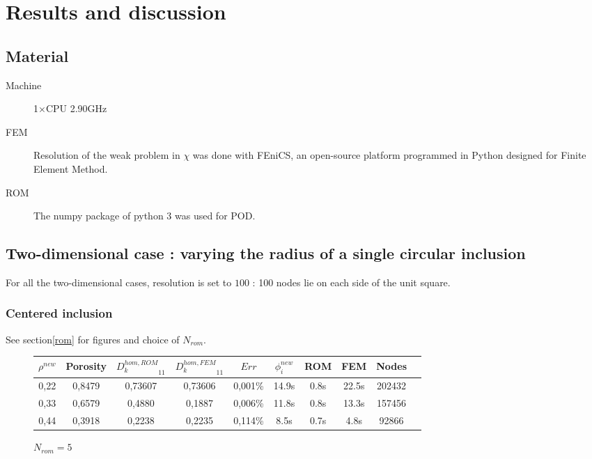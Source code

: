 \section{Results and discussion}\label{res}

\subsection{Material}

\begin{description}
\item [Machine] 1$\times$CPU 2.90GHz
\item [FEM] Resolution of the weak problem in $\chi$ was done with FEniCS, %
an open-source platform programmed in Python designed for Finite Element Method.
\item [ROM] The numpy package of python 3 was used for POD.
\end{description}

\subsection{Two-dimensional case : varying the radius of a single circular inclusion}

For all the two-dimensional cases, resolution is set to $100$ : %
100 nodes lie on each side of the unit square.

\subsubsection{Centered inclusion}

See section\ref{rom} for figures and choice of $N_{rom}$.

\begin{figure}[H]%
%
\begin{center}
\begin{tabular}{|c|c||c|c||c|c||c|c||c||c|}
\hline
$\rho^{new}$&Porosity&${D_k^{hom,ROM}}_{11}$&${D_k^{hom,FEM}}_{11}$&$Err$&$\phi_i^{new}$&ROM&FEM&Nodes\\
\hline
0,22&0,8479&0,73607&0,73606&0,001\%&14.9s&0.8s&22.5s&202432\\
\hline
0,33&0,6579&0,4880&0,1887&0,006\%&11.8s&0.8s&13.3s&157456\\
\hline
0,44&0,3918&0,2238&0,2235&0,114\%&8.5s&0.7s&4.8s&92866\\
\hline
\end{tabular}
\end{center}
\caption{$N_{rom}=5$}
%
\end{figure}

